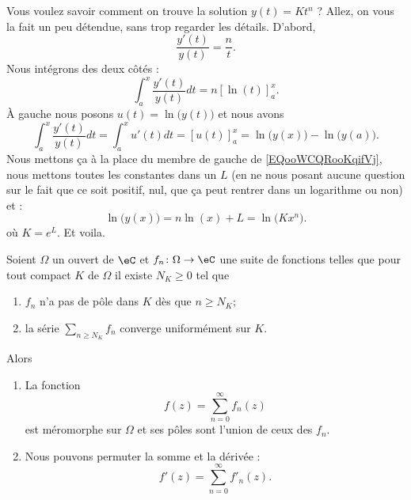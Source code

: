 \begin{normaltext}
	Vous voulez savoir comment on trouve la solution \( y(t)=Kt^n\) ? Allez, on vous la fait un peu détendue, sans trop regarder les détails. D'abord,
	\begin{equation}
		\frac{ y'(t) }{ y(t) }=\frac{ n }{ t }.
	\end{equation}
	Nous intégrons des deux côtés :
	\begin{equation}        \label{EQooWCQRooKqifVj}
		\int_a^x\frac{ y'(t) }{ y(t) }dt=n[\ln(t)]_a^x.
	\end{equation}
	À gauche nous posons \( u(t)=\ln\big( y(t) \big)\) et nous avons
	\begin{equation}
		\int_a^x\frac{ y'(t) }{ y(t) }dt=\int_a^xu'(t)dt=[u(t)]_a^x=\ln\big( y(x) \big)-\ln\big( y(a) \big).
	\end{equation}
	Nous mettons ça à la place du membre de gauche de \eqref{EQooWCQRooKqifVj}, nous mettons toutes les constantes dans un \( L\) (en ne nous posant aucune question sur le fait que ce soit positif, nul, que ça peut rentrer dans un logarithme ou non) et :
	\begin{equation}
		\ln\big( y(x) \big)=n\ln(x)+L=\ln\big( Kx^n \big).
	\end{equation}
	où \( K= e^{L}\). Et voila.
\end{normaltext}

\begin{proposition} \label{PropPUZTQKl}
	Soient \( \Omega\) un ouvert de \( \eC\) et \( f_n\colon \Omega\to \eC\) une suite de fonctions telles que pour tout compact \( K\) de \( \Omega\) il existe \( N_K\geq 0\) tel que
	\begin{enumerate}
		\item
		      \( f_n\) n'a pas de pôle dans \( K\) dès que \( n\geq N_K\);
		\item
		      la série \( \sum_{n\geq N_K}f_n\) converge uniformément sur \( K\).
	\end{enumerate}
	Alors
	\begin{enumerate}
		\item
		      La fonction
		      \begin{equation}
			      f(z)=\sum_{n=0}^{\infty}f_n(z)
		      \end{equation}
		      est méromorphe sur \( \Omega\) et ses pôles sont l'union de ceux des \( f_n\).
		\item
		      Nous pouvons permuter la somme et la dérivée :
		      \begin{equation}
			      f'(z)=\sum_{n=0}^{\infty}f'_n(z).
		      \end{equation}
	\end{enumerate}
\end{proposition}


